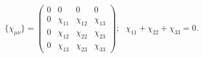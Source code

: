\begin{equation}
\{ \chi_{\mu \nu} \} = \left( \begin{array} {cccc}
0 & 0 & 0 & 0 \\
0 &  \chi_{11}        &   \chi_{12}      &  \chi_{13}  \\
0 &  \chi_{12}        &   \chi_{22}      &  \chi_{23}  \\
0 &  \chi_{13}        &  \chi_{23}       &  \chi_{33} \end{array} \right);~~~ \chi_{11} + \chi_{22} + \chi_{33} = 0.
\label{81}
\end{equation}

